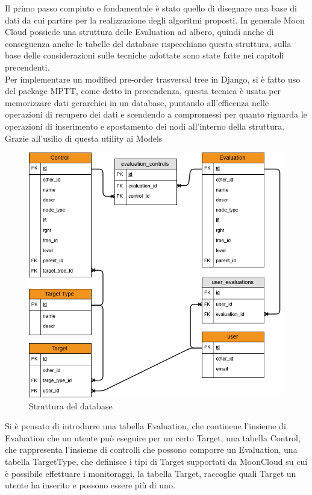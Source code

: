 Il primo passo compiuto e fondamentale è stato quello di disegnare una base di dati da cui partire per la realizzazione degli algoritmi 
proposti.
In generale Moon Cloud possiede una struttura delle Evaluation ad albero, quindi anche di conseguenza anche le tabelle del database 
rispecchiano questa struttura, sulla base delle considerazioni sulle tecniche adottate sono state fatte nei capitoli precendenti.\\
Per implementare un modified pre-order trasversal tree in Django, si è fatto uso del package MPTT, come detto in precendenza, questa
tecnica è usata per memorizzare dati gerarchici in un database, puntando all'efficenza nelle operazioni di recupero dei dati e 
scendendo a compromessi per quanto riguarda le operazioni di inserimento e spostamento dei nodi all'interno della struttura.
Grazie all'usilio di questa utility ai Models 


\begin{figure}
	\centering
	\includegraphics[scale=0.7]{images/MoonCloudRecommendation_ER.png}
	\caption{Struttura del database}
	\label{fig:str_db_project}
\end{figure}

Si è pensato di introdurre una tabella Evaluation, che continene l'insieme di Evaluation che un utente può eseguire per un certo Target,
una tabella Control, che rappresenta l'insieme di controlli che possono comporre un Evaluation, una tabella TargetType, che definisce
i tipi di Target supportati da MoonCloud su cui è possibile effettuare i monitoraggi, la tabella Target, raccoglie quali Target un 
utente ha inserito e possono essere più di uno.

